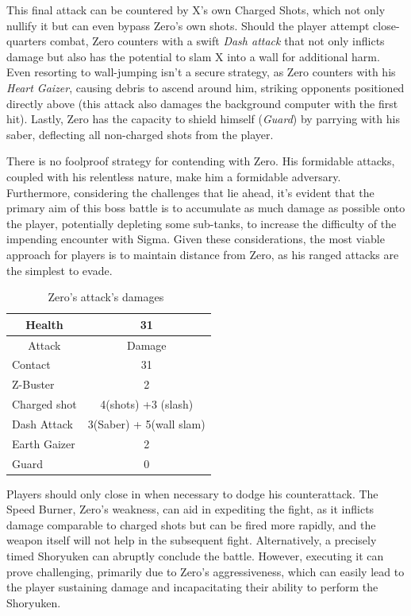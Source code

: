 This final attack can be countered by X's own Charged Shots, which not only nullify it but can even bypass Zero's own shots. Should the player attempt close-quarters combat, Zero counters with a swift \emph{Dash attack} that not only inflicts damage but also has the potential to slam X into a wall for additional harm. Even resorting to wall-jumping isn't a secure strategy, as Zero counters with his \emph{Heart Gaizer}, causing debris to ascend around him, striking opponents positioned directly above (this attack also damages the background computer with the first hit). Lastly, Zero has the capacity to shield himself (\emph{Guard}) by parrying with his saber, deflecting all non-charged shots from the player.

There is no foolproof strategy for contending with Zero. His formidable attacks, coupled with his relentless nature, make him a formidable adversary. Furthermore, considering the challenges that lie ahead, it's evident that the primary aim of this boss battle is to accumulate as much damage as possible onto the player, potentially depleting some sub-tanks, to increase the difficulty of the impending encounter with Sigma. Given these considerations, the most viable approach for players is to maintain distance from Zero, as his ranged attacks are the simplest to evade.
\begin{table}[htp]
	\centering
	\begin{tabular}[h]{l c}
		\toprule
		\multicolumn{1}{c}{Health}  & 31 \\
		\midrule
		\multicolumn{1}{c}{Attack} & \multicolumn{1}{c}{Damage}\\
		Contact & 31\\
		Z-Buster & 2\\
		Charged shot&4(shots) +3 (slash) \\
		Dash Attack & 3(Saber) + 5(wall slam)\\
		Earth Gaizer & 2\\
		Guard & 0\\
		\bottomrule
	\end{tabular}
	\caption{Zero's attack's damages~\cite{wiki:Zero_X2,book:Compendium}}
\end{table}
 Players should only close in when necessary to dodge his counterattack. The Speed Burner, Zero's weakness, can aid in expediting the fight, as it inflicts  damage comparable to charged shots but can be fired more rapidly, and the weapon itself will not help in the subsequent fight. Alternatively, a precisely timed Shoryuken can abruptly conclude the battle. However, executing it can prove challenging, primarily due to Zero's aggressiveness, which can easily lead to the player sustaining damage and incapacitating their ability to perform the Shoryuken.


